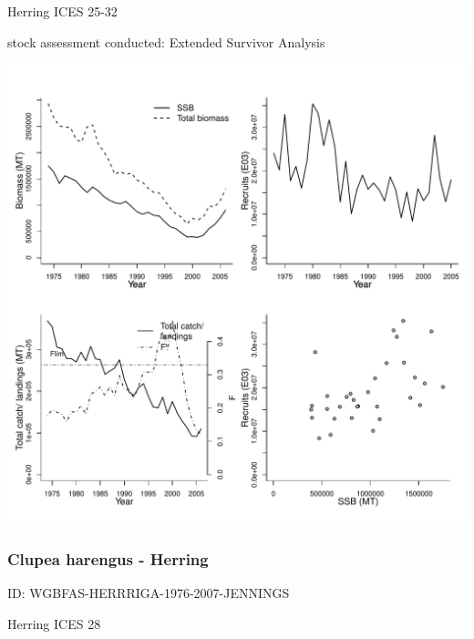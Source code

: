 Herring ICES 25-32 

stock assessment conducted: Extended Survivor Analysis 
\begin{center}
\vspace{-0.2cm}\includegraphics[scale=0.65]{../tex/figures/plot-WGBFAS-HERR2532-1973-2006-JENNINGS.pdf}
\end{center}

\newpage
\subsubsection{Clupea harengus - Herring}
ID: WGBFAS-HERRRIGA-1976-2007-JENNINGS

Herring ICES 28 

